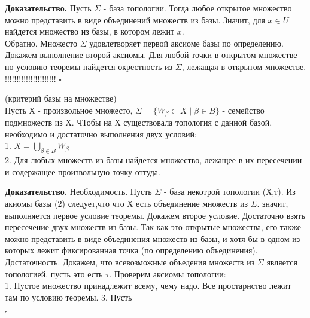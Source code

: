\textbf{Доказательство.} Пусть $\Sigma$ - база топологии. Тогда любое открытое 
множество можно представить в виде объединений множеств из базы. Значит, для
$x\in U$ найдется множество из базы, в котором лежит $x$.  \\
Обратно. Множесто $\Sigma$ удовлетворяет первой аксиоме базы по определению.
Докажем выполнение второй аксиомы. Для любой точки в открытом множестве
по условию теоремы найдется окрестность из $\Sigma$, лежащая в открытом
множестве. 
!!!!!!!!!!!!!!!!!!!!!!
$\square$ 

\begin{theor}
    (критерий базы на множестве)\\
    Пусть Х - произвольное множесто, $\Sigma=\{W_\beta\subset X\mid\beta
    \in B\}$ - семейство подмножеств из Х. ЧТобы на Х существовала
    топология с данной базой, необходимо и достаточно выполнения
    двух условий:\\
    1. $X=\bigcup\limits_{\beta\in B} W_\beta$\\
    2. Для любых множеств из базы найдется множество, лежащее в их
    пересечении и содержащее произвольную точку оттуда.

\end{theor}
\textbf{Доказательство.} Необходимость. Пусть $\Sigma$ - база некотрой 
топологии (Х,т). Из акиомы базы (2) следует,что что Х есть объединение
множеств из $\Sigma$. значит, выполняется первое условие теоремы. Докажем второе 
условие. Достаточно взять пересечение двух множеств из базы. Так как 
это открытые множества, его также можно представить в виде объединения
множеств из базы, и хотя бы в одном из которых лежит фиксированная точка
(по определению объединения).\\
Достаточность. Докажем, что всевозможные объедения множеств из $\Sigma$  
является топологией. пусть это есть $\tau$. Проверим аксиомы топологии:\\
1.  Пустое множество принадлежит всему, чему надо. Все простарнство 
лежит там по условию теоремы.
3. Пусть 


$\square$ 


